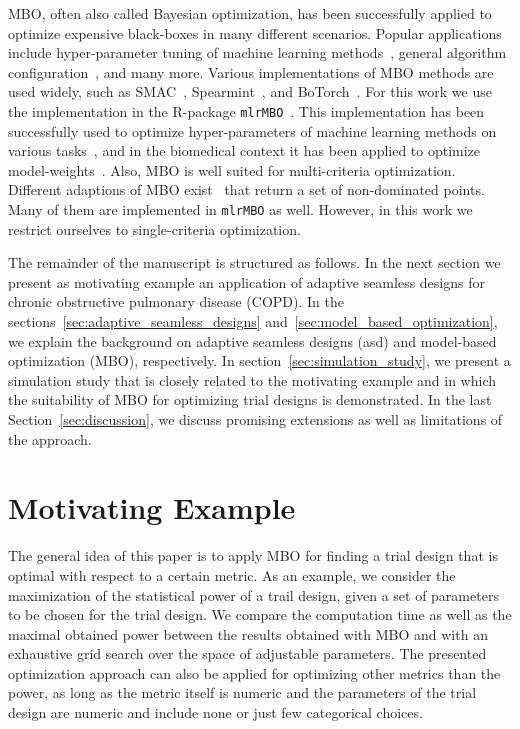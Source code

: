 \documentclass[bimj,fleqn]{w-art}
\theoremstyle{plain}
\theoremstyle{definition}
\begin{document}
MBO, often also called Bayesian optimization, has been successfully applied to optimize expensive black-boxes in many different scenarios.
Popular applications include hyper-parameter tuning of machine learning methods~\citep{snoek_practical_2012}, general algorithm configuration~\citep{hutter_sequential_2011}, and many more.
Various implementations of MBO methods are used widely, such as SMAC~\citep{hutter_sequential_2011}, Spearmint~\citep{snoek_practical_2012}, and BoTorch~\citep{balandat_botorch_2020}.
For this work we use the implementation in the R-package \texttt{mlrMBO}~\citep{bischl_mlrmbo_2017}.
This implementation has been successfully used to optimize hyper-parameters of machine learning methods on various tasks~\citep{bischl_mlrmbo_2017, wozniak_candle_2018}, and in the biomedical context it has been applied to optimize model-weights~\citep{richter_modelbased_2019,browaeys_nichenet_2020}.
Also, MBO is well suited for multi-criteria optimization.
Different adaptions of MBO exist~\citep{horn_modelbased_2015} that return a set of non-dominated points.
Many of them are implemented in \texttt{mlrMBO} as well.
However, in this work we restrict ourselves to single-criteria optimization. 

The remainder of the manuscript is structured as follows.
In the next section we present as motivating example an application of adaptive seamless designs for chronic obstructive pulmonary disease (COPD).
In the sections~\ref{sec:adaptive_seamless_designs} and~\ref{sec:model_based_optimization}, we explain the background on adaptive seamless designs (asd) and model-based optimization (MBO), respectively.
In section~\ref{sec:simulation_study}, we present a simulation study that is closely related to the motivating example and in which the suitability of MBO for optimizing trial designs is demonstrated.
In the last Section~\ref{sec:discussion}, we discuss promising extensions as well as limitations of the approach.

\section{Motivating Example}
\label{sec:motivating_example}

The general idea of this paper is to apply MBO for finding a trial design that is optimal with respect to a certain metric.
As an example, we consider the maximization of the statistical power of a trail design, given a set of parameters to be chosen for the trial design.
We compare the computation time as well as the maximal obtained power between the results obtained with MBO and with an exhaustive grid search over the space of adjustable parameters.
The presented optimization approach can also be applied for optimizing other metrics than the power, as long as the metric itself is numeric and the parameters of the trial design are numeric and include none or just few categorical choices.
\end{document}
